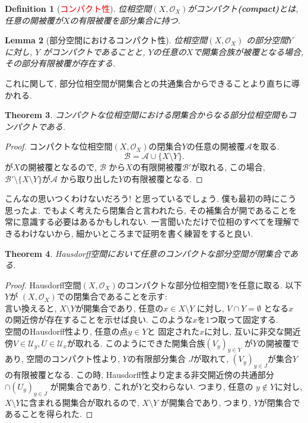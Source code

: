 \documentclass[lualatex]{ltjsbook}
\newtheorem{theorem}{Theorem}[section]
\newtheorem{lemma}[theorem]{Lemma}
\newtheorem{definition}[theorem]{Definition}
\theoremstyle{remark}
\theoremstyle{plain}
\begin{document}
\begin{definition}[\textcolor{red}{コンパクト性}]
	位相空間$\left( X , \mathcal{O}_{X} \right)$がコンパクト\textbf{(compact)}とは, 任意の開被覆が$X$の有限被覆を部分集合に持つ.	
\end{definition}

\begin{lemma}[部分空間におけるコンパクト性]
	位相空間$\left( X , \mathcal{O}_{X} \right)$ の部分空間$Y$ に対し, 
	$Y$ がコンパクトであることと,  $Y$の任意の$X$で開集合族が被覆となる場合, その部分有限被覆が存在する.
\end{lemma}

これに関して, 部分位相空間が開集合との共通集合からできることより直ちに導かれる.

\begin{theorem}
	コンパクトな位相空間における閉集合からなる部分位相空間もコンパクトである.
\end{theorem}

\begin{proof}
	コンパクトな位相空間$\left( X , \mathcal{O}_{X} \right)$の閉集合$Y$の任意の開被覆$\mathcal{A}$を取る.
	\[
		\mathcal{B}= \mathcal{A} \cup \{X \setminus Y\}
	.\] 
	が$X$の開被覆となるので,  $\mathcal{B}$ から$X$の有限開被覆$\mathcal{B'}$が取れる, この場合, $\mathcal{B'} \setminus \{ X \setminus Y\}$が$\mathcal{A}$ から取り出した$Y$の有限被覆となる. 
\end{proof}

こんなの思いつくわけないだろう! と思っているでしょう. 僕も最初の時にこう思ったよ. 
でもよく考えたら閉集合と言われたら, その補集合が開であることを常に意識する必要はあるかもしれない. 
一言聞いただけで位相のすべてを理解できるわけないから, 細かいところまで証明を書く練習をすると良い.

\begin{theorem}
	Hausdorff空間において任意のコンパクトな部分空間が閉集合である.
\end{theorem}

\begin{proof}
	Hausdorff空間$\left( X , \mathcal{O}_{X} \right)$のコンパクトな部分位相空間$Y$を任意に取る.
	以下$Y$が $\left(  X, \mathcal{O}_{X} \right)$での閉集合であることを示す:\\
	言い換えると, $X\setminus Y$が開集合であり, 任意の$x \in X \setminus Y$ に対し,
	$V \cap Y = \emptyset$ となる$x$ の開近傍が存在することを示せば良い. このような$x$を1つ取って固定する.\\
	空間のHausdorff性より, 任意の点$y \in Y$と 固定された$x$に対し, 互いに非交な開近傍$V \in \mathcal{U}_y,U \in \mathcal{U}_x$が取れる. 
	このようにできた開集合族$\left( V_y \right) _{y \in Y}$ が$Y$の開被覆であり,
	空間のコンパクト性より,  $Y$の有限部分集合 $J$が取れて, 
	$\left( V_y \right) _{y \in J}$が集合$Y$の有限被覆となる. 
	この時, Hausdorff性より定まる非交開近傍の共通部分 $\cap \left( U_y \right) _{y \in J}$ が開集合であり, 
	これが$Y$と交わらない.
	つまり, 任意の $y \not\in Y$に対し,
	$X \setminus Y$に含まれる開集合が取れるので, 
	$X \setminus Y$ が開集合であり, 
	つまり, $Y$が閉集合であることを得られた.
\end{proof}
\end{document}

